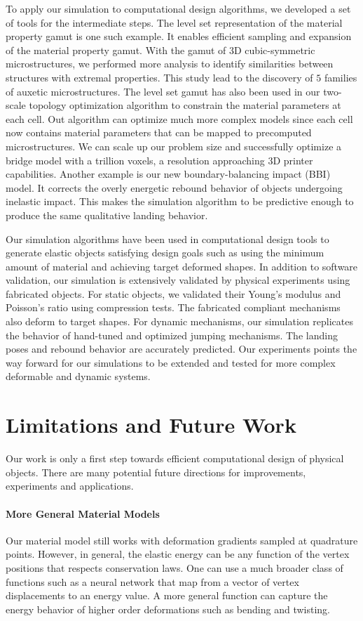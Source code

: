 To apply our simulation to computational design algorithms, we developed a set of tools for the intermediate steps.
The level set representation of the material property gamut is one such example.
It enables efficient sampling and expansion of the material property gamut.
With the gamut of 3D cubic-symmetric microstructures, we performed more analysis to identify similarities between structures with extremal properties.
This study lead to the discovery of $5$ families of auxetic microstructures.
The level set gamut has also been used in our two-scale topology optimization algorithm to constrain the material parameters at each cell.
Out algorithm can optimize much more complex models since each cell now contains material parameters that can be mapped to precomputed microstructures.
We can scale up our problem size and successfully optimize a bridge model with a trillion voxels, a resolution approaching 3D printer capabilities.
Another example is our new boundary-balancing impact (BBI) model.
It corrects the overly energetic rebound behavior of objects undergoing inelastic impact.
This makes the simulation algorithm to be predictive enough to produce the same qualitative landing behavior.

Our simulation algorithms have been used in computational design tools to generate elastic objects satisfying design goals
such as using the minimum amount of material and achieving target deformed shapes.
In addition to software validation, our simulation is extensively validated by physical experiments using fabricated objects.
For static objects, we validated their Young's modulus and Poisson's ratio using compression tests.
The fabricated compliant mechanisms also deform to target shapes.
For dynamic mechanisms, our simulation replicates the behavior of hand-tuned and optimized jumping mechanisms.
The landing poses and rebound behavior are accurately predicted.
Our experiments points the way forward for our simulations to be extended and tested for more complex deformable and dynamic systems.

\section{Limitations and Future Work}
Our work is only a first step towards efficient computational design of physical objects.
There are many potential future directions for improvements, experiments and applications.
\paragraph{More General Material Models}
Our material model still works with deformation gradients sampled at quadrature points.
However, in general, the elastic energy can be any function of the vertex positions that respects conservation laws.
One can use a much broader class of functions such as a neural network that map from a vector of vertex displacements to an energy value.
A more general function can capture the energy behavior of higher order deformations such as bending and twisting.
